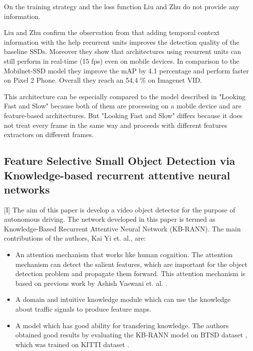 \documentclass[conference]{IEEEtran}
\begin{document}
On the training strategy and the loss function Liu and Zhu do not provide any information. \newline

Liu and Zhu confirm the observation from \cite{b1} that adding temporal context information with the help recurrent units improves the detection quality of the baseline SSDs. Moreover they show that architectures using recurrent units can still perform in real-time (15 fps) even on mobile devices. In comparison to the Mobilnet-SSD model they improve the mAP by 4.1 percentage and perform faster on Pixel 2 Phone. Overall they reach an 54.4 \% on Imagenet VID. \newline

This architecture can be especially compared to the model described in "Looking Fast and Slow" because both of them are processing on a mobile device and are feature-based architectures. But "Looking Fast and Slow" differs because it does not treat every frame in the same way and proceeds with different features extractors on different frames. 

\subsection{Feature Selective Small Object Detection via Knowledge-based recurrent attentive neural networks \cite{b6}}

[I] The aim of this paper is develop a video object detector for the purpose of autonomous driving. The network developed in this paper is termed as Knowledge-Based Recurrent Attentive Neural Network (KB-RANN). \newline
The main contributions of the authors, Kai Yi et. al., are:
\begin{itemize}
  \item An attention mechanism that works like human cognition. The attention mechanism can detect the salient features, which are important for the object detection problem and propagate them forward. This attention mechanism is based on previous work by Ashish Vaswani et. al. \cite{b30}. 
  \item A domain and intuitive knowledge module which can use the knowledge about traffic signals to produce feature maps.
  \item A model which has good ability for transfering knowledge. The authors obtained good results by evaluating the KB-RANN model on BTSD dataset \cite{b29}, which was trained on KITTI dataset \cite{b21}.
\end{itemize}
\end{document}
